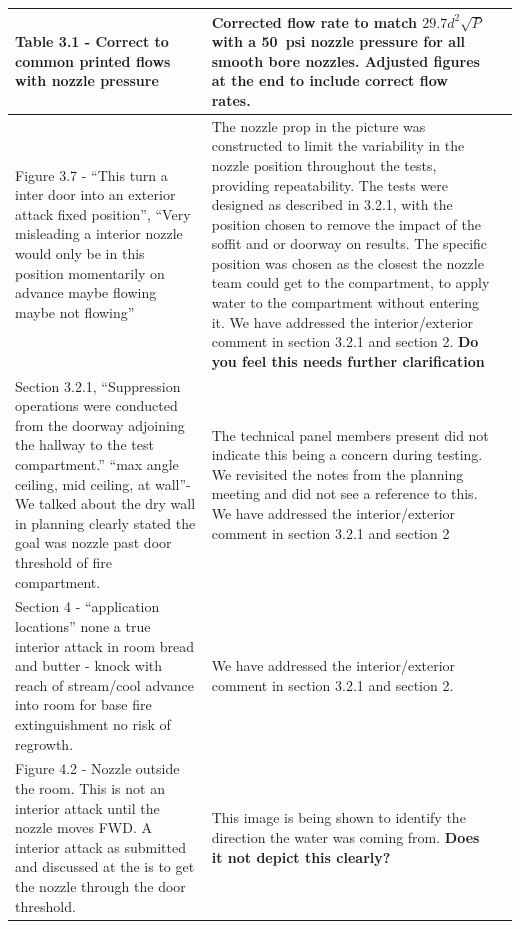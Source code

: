 \documentclass[12pt,oneside]{book}
\begin{document}
\begin{landscape}
\begin{longtable}{|L{4in}|L{3.75in}|c|}
		\hline
		Table 3.1 - Correct to common printed flows with nozzle pressure & 
		Corrected flow rate to match $29.7d^2\sqrt{P}$ with a 50~psi nozzle pressure for all smooth bore nozzles. Adjusted figures at the end to include correct flow rates. & \checkmark \\

		\hline
		Figure 3.7 - ``This turn a inter door into an exterior attack fixed position'', ``Very misleading a interior nozzle would only be in this position momentarily on advance maybe flowing maybe not flowing'' &
		The nozzle prop in the picture was constructed to limit the variability in the nozzle position throughout the tests, providing repeatability. The tests were designed as described in 3.2.1, with the position chosen to remove the impact of the soffit and or doorway on results. The specific position was chosen as the closest the nozzle team could get to the compartment, to apply water to the compartment without entering it. We have addressed the interior/exterior comment in section 3.2.1 and section 2. \textbf{Do you feel this needs further clarification} & \\

		\hline
		Section 3.2.1, ``Suppression operations were conducted from the doorway adjoining the hallway to the test compartment.'' ``max angle ceiling, mid ceiling, at wall''- We talked about the dry wall in planning clearly stated the goal was nozzle past door threshold of fire compartment. &
		The technical panel members present did not indicate this being a concern during testing. We revisited the notes from the planning meeting and did not see a reference to this.  We have addressed the interior/exterior comment in section 3.2.1 and section 2 & \\

		\hline
		Section 4 - ``application locations'' none a true interior attack in room bread and butter - knock with reach of stream/cool advance into room for base fire extinguishment no risk of regrowth. & 
		We have addressed the interior/exterior comment in section 3.2.1 and section 2. & \\

		\hline
		Figure 4.2 - Nozzle outside the room. This is not an interior attack until the nozzle moves FWD. A interior attack as submitted and discussed at the is to get the nozzle through the door threshold. & 
		This image is being shown to identify the direction the water was coming from. \textbf{Does it not depict this clearly?} & \\


\end{longtable}
\end{landscape}
\end{document}
